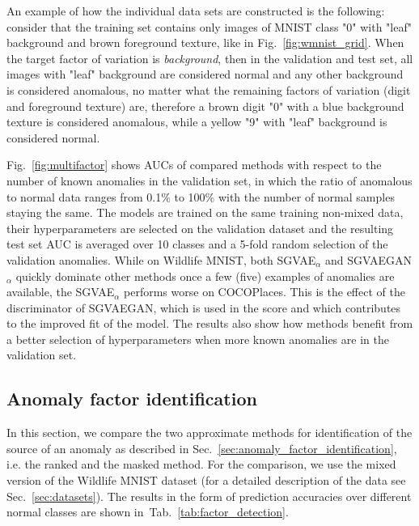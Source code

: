 An example of how the individual data sets are constructed is the following: consider that the training set contains only images of MNIST class "0" with "leaf" background and brown foreground texture, like in Fig.~\ref{fig:wmnist_grid}. When the target factor of variation is \textit{background}, then in the validation and test set, all images with "leaf" background are considered normal and any other background is considered anomalous, no matter what the remaining factors of variation (digit and foreground texture) are, therefore a brown digit "0" with a blue background texture is considered anomalous, while a yellow "9" with "leaf" background is considered normal.

Fig.~\ref{fig:multifactor} shows AUCs of compared methods with respect to the number of known anomalies in the validation set, in which the ratio of anomalous to normal data ranges from 0.1\% to 100\% with the number of normal samples staying the same. The models are trained on the same training non-mixed data, their hyperparameters are selected on the validation dataset and the resulting test set AUC is averaged over 10 classes and a 5-fold random selection of the validation anomalies. While on Wildlife MNIST, both SGVAE$_\alpha$ and SGVAEGAN$_\alpha$ quickly dominate other methods once a few (five) examples of anomalies are available, the SGVAE$_\alpha$ performs worse on COCOPlaces. This is the effect of the discriminator of SGVAEGAN, which is used in the score and which contributes to the improved fit of the model. The results also show how methods benefit from a better selection of hyperparameters when more known anomalies are in the validation set.

\subsection{Anomaly factor identification} \label{sec:anomaly_factor_identification_experiments}
In this section, we compare the two approximate methods for identification of the source of an anomaly as described in Sec.~\ref{sec:anomaly_factor_identification}, i.e. the ranked and the masked method. For the comparison, we use the mixed version of the Wildlife MNIST dataset (for a detailed description of the data see Sec.~\ref{sec:datasets}). The results in the form of prediction accuracies over different normal classes are shown in~Tab.~\ref{tab:factor_detection}. 



